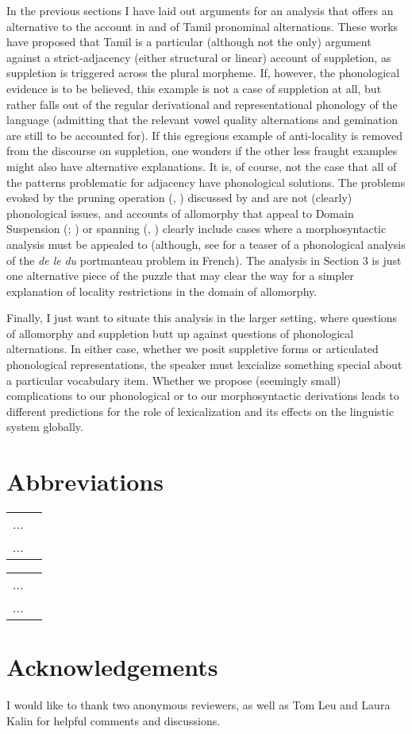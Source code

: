 \documentclass[output=paper,colorlinks,citecolor=brown,
]{langscibook}
\begin{document}
In the previous sections I have laid out arguments for an analysis that offers an alternative to the account in \citet{Moskal2015} and \citet{moskal2016towards} of Tamil pronominal alternations. These works have proposed that Tamil is a particular (although not the only) argument against a strict-adjacency (either structural or linear) account of suppletion, as suppletion is triggered across the plural morpheme. If, however, the phonological evidence is to be believed, this example is not a case of suppletion at all, but rather falls out of the regular derivational and representational phonology of the language (admitting that the relevant vowel quality alternations and gemination are still to be accounted for). If this egregious example of anti-locality is removed from the discourse on suppletion, one wonders if the other less fraught examples might also have alternative explanations. It is, of course, not the case that all of the patterns problematic for adjacency have phonological solutions. The  problems evoked by the pruning operation (\citealt{Embick2003}, \citeyear{embick2010localism}) discussed by \citet{Moskal2015} and \citet{moskal2016towards} are not (clearly) phonological issues, and accounts of allomorphy that appeal to Domain Suspension (\citealt{bobaljik2012universals}; \citealt{BobaljikWurmbrand2013}) or spanning (\citealt{Merchant2015}, \citet{svenonius2016spans}) clearly include cases where a morphosyntactic analysis must be appealed to (although, see \citet{newell2018re} for a teaser of a phonological analysis of the\textit{ de le} \rightarrow \textit{du} portmanteau problem in French). The analysis in Section 3 is just one alternative piece of the puzzle that may clear the way for a simpler explanation of locality restrictions in the domain of allomorphy.

Finally, I just want to situate this analysis in the larger setting, where questions of allomorphy and suppletion butt up against questions of phonological alternations. In either case, whether we posit suppletive forms or articulated phonological representations, the speaker must lexcialize something special about a particular vocabulary item. Whether we propose (seemingly small) complications to our phonological or to our morphosyntactic derivations leads to different predictions for the role of lexicalization and its effects on the linguistic system globally.

\section*{Abbreviations}
\begin{tabularx}{.45\textwidth}{lQ}
... & \\
... & \\
\end{tabularx}
\begin{tabularx}{.45\textwidth}{lQ}
... & \\
... & \\
\end{tabularx}

\section*{Acknowledgements}
I would like to thank two anonymous reviewers, as well as Tom Leu and Laura Kalin for helpful comments and discussions.

\printbibliography[heading=subbibliography,notkeyword=this]
\end{document}
